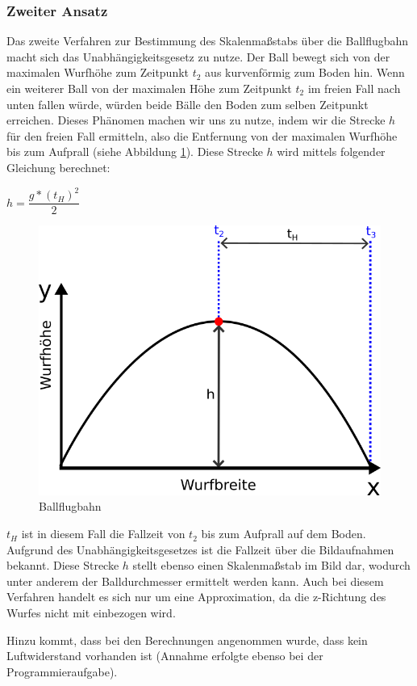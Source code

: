 \documentclass{ezb}
\begin{document}
\subsubsection*{Zweiter Ansatz}
Das zweite Verfahren zur Bestimmung des Skalenmaßstabs über die Ballflugbahn macht sich das Unabhängigkeitsgesetz zu nutze. Der Ball bewegt sich von der maximalen Wurfhöhe zum Zeitpunkt $t_2$ aus kurvenförmig zum Boden hin. Wenn ein weiterer Ball von der maximalen Höhe zum Zeitpunkt $t_2$ im freien Fall nach unten fallen würde, würden beide Bälle den Boden zum selben Zeitpunkt erreichen. Dieses Phänomen machen wir uns zu nutze, indem wir die Strecke $h$ für den freien Fall ermitteln, also die Entfernung von der maximalen Wurfhöhe bis zum Aufprall (siehe Abbildung \ref{abb:freierfall}). Diese Strecke $h$ wird mittels folgender Gleichung berechnet:
\begin{center}
$h = \dfrac{g * (t_H)^2}{2}$
\end{center}
\begin{figure}[!h]
	\centering
	\includegraphics[scale=1.5]{./img/BallflugbahnAnsatz2.png}
	\caption{Ballflugbahn}
	\label{abb:freierfall}
\end{figure}
$t_H$ ist in diesem Fall die Fallzeit von $t_2$ bis zum Aufprall auf dem Boden. Aufgrund des Unabhängigkeitsgesetzes ist die Fallzeit über die Bildaufnahmen bekannt.
Diese Strecke $h$ stellt ebenso einen Skalenmaßstab im Bild dar, wodurch unter anderem der Balldurchmesser ermittelt werden kann. Auch bei diesem Verfahren handelt es sich nur um eine Approximation, da die z-Richtung des Wurfes nicht mit einbezogen wird.

Hinzu kommt, dass bei den Berechnungen angenommen wurde, dass kein Luftwiderstand vorhanden ist (Annahme erfolgte ebenso bei der Programmieraufgabe).




\end{document}
